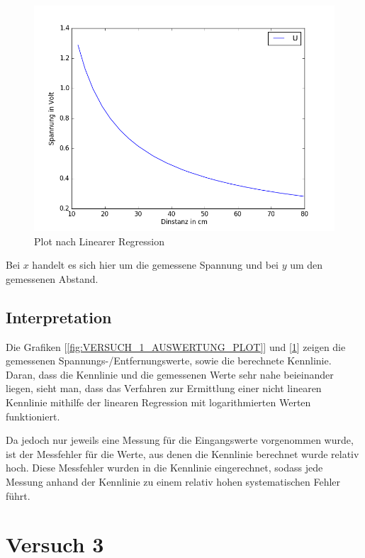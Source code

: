 \documentclass[12pt,oneside,a4paper]{report}
\begin{document}
\begin{figure}[H]
	\centering\small
	\includegraphics[width=\textwidth]{media/plot_messungen_funktion.png}
	\caption{Plot nach Linearer Regression}
	\label{fig:VERSUCH_2_AUSWERTUNG_PLOT}
\end{figure}

Bei \(x\) handelt es sich hier um die gemessene Spannung und bei \(y\) um den gemessenen Abstand.

\section{Interpretation}
\label{chap:VERSUCH_2_INTERPRETATION}
Die Grafiken [\ref{fig:VERSUCH_1_AUSWERTUNG_PLOT}] und [\ref{fig:VERSUCH_2_AUSWERTUNG_PLOT}] zeigen die gemessenen Spannungs-/Entfernungswerte, sowie die berechnete Kennlinie. Daran, dass die Kennlinie und die gemessenen Werte sehr nahe beieinander liegen, sieht man, dass das Verfahren zur Ermittlung einer nicht linearen Kennlinie mithilfe der linearen Regression mit logarithmierten Werten funktioniert.

Da jedoch nur jeweils eine Messung für die Eingangswerte vorgenommen wurde, ist der Messfehler für die Werte, aus denen die Kennlinie berechnet wurde relativ hoch. Diese Messfehler wurden in die Kennlinie eingerechnet, sodass jede Messung anhand der Kennlinie zu einem relativ hohen systematischen Fehler führt.


\chapter{Versuch 3}
\label{chap:VERSUCH_3}
\end{document}
